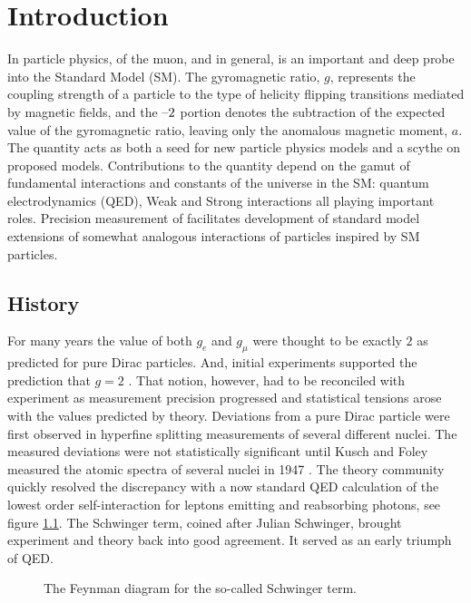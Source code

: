 \chapter {Introduction}
In particle physics, \gmtwo of the muon, and \gmtwo in general, is an important and deep probe into the Standard Model (SM). The gyromagnetic ratio, $g$, represents the coupling strength of a particle to the type of helicity flipping transitions mediated by magnetic fields, and the $\hbox{--}2$ portion denotes the subtraction of the expected value of the gyromagnetic ratio, leaving only the anomalous magnetic moment, $a$.  The quantity acts as both a seed for new particle physics models and a scythe on proposed models.   Contributions to the quantity depend on the gamut of fundamental interactions and constants of the universe in the SM: quantum electrodynamics (QED), Weak and Strong interactions all playing important roles.  Precision measurement of \gmtwo facilitates development of standard model extensions of somewhat analogous interactions of particles inspired by SM particles.

\section{History}

For many years the value of both $g_e$ and $g_\mu$ were thought to be exactly $2$ as predicted for pure Dirac particles\cite{the-muon-g-2}. And, initial experiments supported the prediction that $g = 2$ . That notion, however, had to be reconciled with experiment as measurement precision progressed and statistical tensions arose with the values predicted by theory.  Deviations from a pure Dirac particle were first observed in hyperfine splitting measurements of several different nuclei.  The measured deviations were not statistically significant until Kusch and Foley measured the atomic spectra of several nuclei in 1947 \cite{kusch-foley}.  The theory community quickly resolved the discrepancy with a now standard QED calculation of the lowest order self-interaction for leptons emitting and reabsorbing photons, see figure \ref{fig:schwinger-diagram}.  The Schwinger term, coined after Julian Schwinger, brought experiment and theory back into good agreement.  It served as an early triumph of QED. 

\begin{figure}
\centering
{}
\label{fig:schwinger-diagram}
\caption{The Feynman diagram for the so-called Schwinger term.}
\end{figure}

